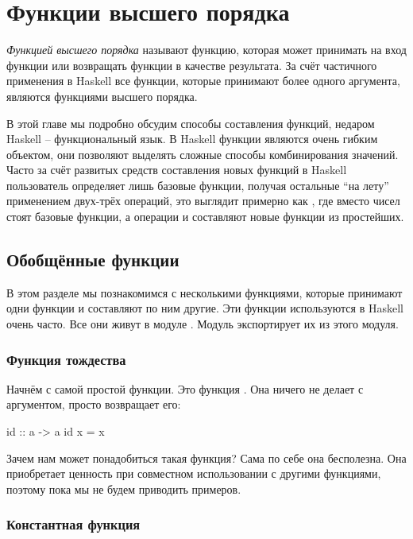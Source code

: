 \chapter{Функции высшего порядка}

 \emph{Функцией высшего порядка} называют функцию,
которая может принимать на вход функции или возвращать функции в
качестве результата. За счёт частичного применения в Haskell все
функции, которые принимают более одного аргумента, являются функциями
высшего порядка.

В этой главе мы подробно обсудим способы составления функций, недаром
Haskell -- функциональный язык. В Haskell функции являются очень гибким
объектом, они позволяют выделять сложные способы комбинирования
значений. Часто за счёт развитых средств составления новых функций в
Haskell пользователь определяет лишь базовые функции, получая остальные
``на лету'' применением двух-трёх операций, это выглядит примерно как
, где вместо чисел стоят базовые функции, а операции \In{+}
и \In{*} составляют новые функции из простейших.

\section{Обобщённые функции}

В этом разделе мы познакомимся с несколькими функциями, которые
принимают одни функции и составляют по ним другие. Эти функции
используются в Haskell очень часто. Все они живут в модуле
. Модуль  экспортирует их из этого модуля.

\subsection{Функция тождества}

Начнём с самой простой функции. Это функция . Она ничего не
делает с аргументом, просто возвращает его:


\begin{code}
id :: a -> a
id x = x
\end{code}

Зачем нам может понадобиться такая функция? Сама по себе она бесполезна.
Она приобретает ценность при совместном использовании с другими
функциями, поэтому пока мы не будем приводить примеров.

\subsection{Константная функция}

